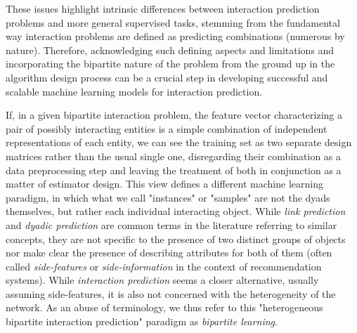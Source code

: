These issues highlight intrinsic differences between interaction prediction problems and more general supervised tasks,
stemming from the fundamental way interaction problems are defined as predicting combinations (numerous by nature). %
Therefore, acknowledging such defining aspects and limitations and incorporating the bipartite nature of the problem from the ground up in the algorithm design process can be a crucial step in developing successful and scalable machine learning models for interaction prediction.

If, in a given bipartite interaction problem, the feature vector characterizing a pair of possibly interacting entities is a simple combination of independent representations of each entity, we can see the training set as two separate design matrices rather than the usual single one, disregarding their combination as a data preprocessing step and leaving the treatment of both in conjunction as a matter of estimator design. This view defines a different machine learning paradigm, in which what we call "instances" or "samples" are not the dyads themselves, but rather each individual interacting object. While \emph{link prediction} and \emph{dyadic prediction} are common terms in the literature referring to similar concepts, they are not specific to the presence of two distinct groups of objects nor make clear the presence of describing attributes for both of them (often called \emph{side-features} or \emph{side-information} in the context of recommendation systems). While \emph{interaction prediction} seems a closer alternative,
usually assuming side-features, %
it is also not concerned with the heterogeneity of the network.
As an abuse of terminology, we thus refer to this "heterogeneous bipartite interaction prediction" paradigm as \emph{bipartite learning}.

